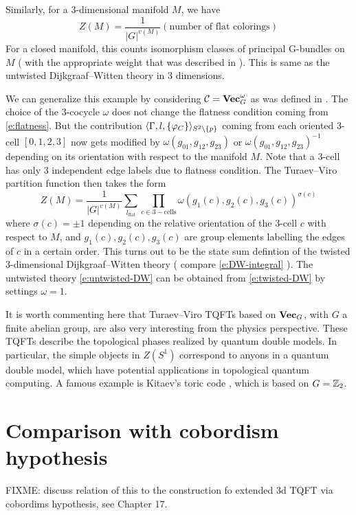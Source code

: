 Similarly, for a 3-dimensional manifold $M$, we have
\begin{equation}\label{e:untwisted-DW}
	Z(M) = \frac{1}{|G|^{v(M)}} (\text{number of flat colorings})
\end{equation}
For a closed manifold, this counts isomorphism classes of principal G-bundles on $M$ ( with the appropriate
 weight that was described in  ). This is same as the untwisted Dijkgraaf--Witten theory
  in 3 dimensions.


We can generalize this example by considering $\mathcal{C} = \mathbf{Vec}_G^\omega$ as was defined in . 
The choice of the 3-cocycle $\omega$ does not change the flatness condition coming from \eqref{e:flatness}. 
But the contribution $\langle\Gamma,l,\{ \varphi_C\}\rangle_{S^2\setminus\{p\}}$ 
 coming from each oriented 3-cell $[0,1,2,3]$ now gets modified by $\omega(g_{01},g_{12},g_{23})$ or 
 $\omega(g_{01},g_{12},g_{23})^{-1}$ depending on its orientation with respect to the manifold $M$. Note that a 3-cell 
 has only 3 independent edge labels due to flatness condition. The Turaev--Viro partition function then takes the form
\begin{equation}\label{e:twisted-DW}
Z(M) = \frac{1}{|G|^{v(M)}} \sum_{l_\mathrm{flat}} \prod_{c \in \mathrm{3-cells}} \omega(g_1(c),g_2(c),g_3(c))^{\sigma(c)}
\end{equation}
where $\sigma(c) = \pm 1 $ depending on the relative orientation of the 3-cell $c$ with respect to $M$, and 
$g_1(c),g_2(c),g_3(c)$ are group elements labelling the edges of $c$ in a certain order. This turns out to be 
the state sum defintion of the twisted 3-dimensional Dijkgraaf--Witten theory ( compare \eqref{e:DW-integral} ). The
 untwisted theory \eqref{e:untwisted-DW} can be obtained from \eqref{e:twisted-DW} by settings $\omega=1$.


It is worth commenting here that Turaev--Viro TQFTs based on $\mathbf{Vec}_G$, with $G$ a finite abelian group,
 are also very interesting from the physics perspective. These TQFTs describe the topological phases realized 
 by quantum double models. In particular, the simple objects in $Z(S^1)$ correspond to anyons in a 
 quantum double model, which have potential applications in topological quantum computing. A famous example
  is Kitaev's toric code \cite{kitaev}, which is based on $G=\mathbb{Z}_2$.


\section{Comparison with cobordism hypothesis}\label{auto:c19-TV-comparison-with-cobordism-hypothesis}
FIXME: discuss relation of this to the construction fo extended 3d TQFT via cobordims hypothesis, see Chapter 17. 